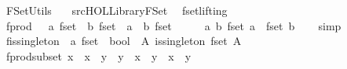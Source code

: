 %
\begin{isabellebody}%
%
%
\isadelimtheory
%
\endisadelimtheory
%
\isatagtheory
{}\isamarkupfalse%
\ FSet{\isacharunderscore}Utils\isanewline
\ \ \ {\isachardoublequoteopen}{\isachartilde}{\isachartilde}{\isacharslash}src{\isacharslash}HOL{\isacharslash}Library{\isacharslash}FSet{\isachardoublequoteclose}\isanewline
{}%
\endisatagtheory
{\isafoldtheory}%
%
\isadelimtheory
\isanewline
%
\endisadelimtheory
\isanewline
{}\isamarkupfalse%
\ \ fset{\isachardot}lifting\ \isanewline
{}\isamarkupfalse%
\ fprod\ \ {\isacharcolon}{\isacharcolon}\ {\isachardoublequoteopen}{\isacharprime}a\ fset\ {\isasymRightarrow}\ {\isacharprime}b\ fset\ {\isasymRightarrow}\ {\isacharparenleft}{\isacharprime}a\ {\isasymtimes}\ {\isacharprime}b{\isacharparenright}\ fset\ {\isachardoublequoteclose}\ {\isacharparenleft}\ {\isachardoublequoteopen}{\isacharbar}{\isasymtimes}{\isacharbar}{\isachardoublequoteclose}\ {}{}{\isacharparenright}\ \ {\isachardoublequoteopen}{\isasymlambda}a\ b{\isachardot}\ fset\ a\ {\isasymtimes}\ fset\ b{\isachardoublequoteclose}\isanewline
%
\isadelimproof
\ \ %
\endisadelimproof
%
\isatagproof
{}\isamarkupfalse%
\ simp%
\endisatagproof
{\isafoldproof}%
%
\isadelimproof
\isanewline
%
\endisadelimproof
\isanewline
{}\isamarkupfalse%
\ fis{\isacharunderscore}singleton\ {\isacharcolon}{\isacharcolon}\ {\isachardoublequoteopen}{\isacharprime}a\ fset\ {\isasymRightarrow}\ bool{\isachardoublequoteclose}\ \ {\isachardoublequoteopen}{\isasymlambda}A{\isachardot}\ is{\isacharunderscore}singleton\ {\isacharparenleft}fset\ A{\isacharparenright}{\isachardoublequoteclose}%
\isadelimproof
%
\endisadelimproof
%
\isatagproof
\isacommand{{\isachardot}}\isamarkupfalse%
%
\endisatagproof
{\isafoldproof}%
%
\isadelimproof
%
\endisadelimproof
\isanewline
{}\isamarkupfalse%
\isanewline
\isanewline
{}\isamarkupfalse%
\ fprod{\isacharunderscore}subset{\isacharcolon}\ {\isachardoublequoteopen}x\ {\isacharbar}{\isasymsubseteq}{\isacharbar}\ x{\isacharprime}\ {\isasymand}\ y\ {\isacharbar}{\isasymsubseteq}{\isacharbar}\ y{\isacharprime}\ {\isasymLongrightarrow}\ x\ {\isacharbar}{\isasymtimes}{\isacharbar}\ y\ {\isacharbar}{\isasymsubseteq}{\isacharbar}\ x{\isacharprime}\ {\isacharbar}{\isasymtimes}{\isacharbar}\ y{\isacharprime}{\isachardoublequoteclose}\isanewline

\end{isabellebody}
